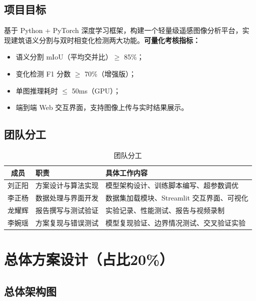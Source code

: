\documentclass[12pt,a4paper]{article}
\begin{document}
\subsection{项目目标}

基于 Python + PyTorch 深度学习框架，构建一个轻量级遥感图像分析平台，实现建筑语义分割与双时相变化检测两大功能。\textbf{可量化考核指标：}

\begin{itemize}
    \item 语义分割 mIoU（平均交并比）$\geq$ 85\%；
    \item 变化检测 F1 分数 $\geq$ 70\%（增强版）；
    \item 单图推理耗时 $\leq$ 50ms（GPU）；
    \item 端到端 Web 交互界面，支持图像上传与实时结果展示。
\end{itemize}

\subsection{团队分工}

\begin{table}[H]
\centering
\caption{团队分工}
\label{tab:team}
\begin{tabular}{cll}
\toprule
成员 & 职责 & 具体工作内容 \\
\midrule
刘正阳 & 方案设计与算法实现 & 模型架构设计、训练脚本编写、超参数调优 \\
李正杨 & 数据处理与界面开发 & 数据集加载模块、Streamlit 交互界面、可视化 \\
龙耀辉 & 报告撰写与测试验证 & 实验记录、性能测试、报告与视频录制 \\
李婉瑶 & 方案复现与错误测试 & 模型复现验证、边界情况测试、交叉验证实验 \\
\bottomrule
\end{tabular}
\end{table}

\section{总体方案设计（占比20\%）}

\subsection{总体架构图}
\end{document}
